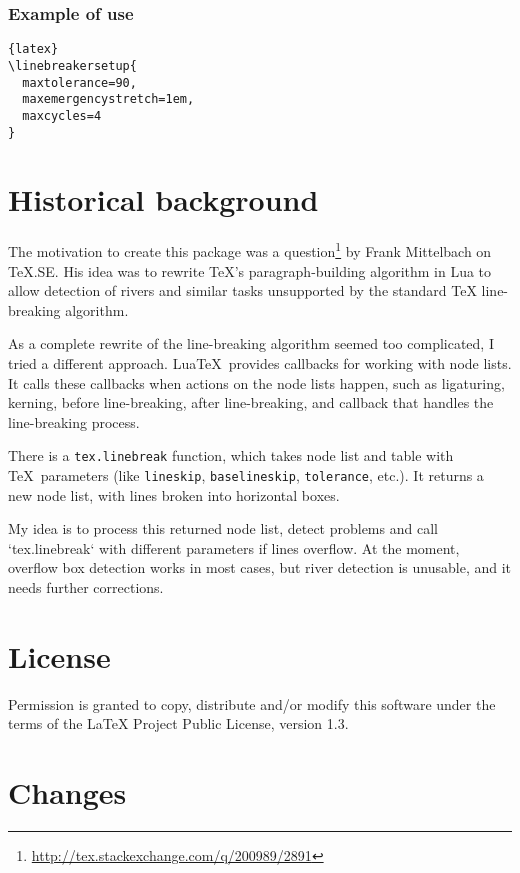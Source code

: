 \documentclass{l3doc}
\begin{document}
\subsubsection{Example of \cmd{\linebreakersetup} use}

\begin{lstlisting}{latex}
\linebreakersetup{
  maxtolerance=90,
  maxemergencystretch=1em,
  maxcycles=4
}
\end{lstlisting}



\section{Historical background}

The motivation to create this package was a 
question\footnote{\url{http://tex.stackexchange.com/q/200989/2891}} by Frank Mittelbach on
TeX.SE. His idea was to rewrite TeX’s paragraph-building algorithm in Lua to
allow detection of rivers and similar tasks unsupported by the standard TeX
line-breaking algorithm.

As a complete rewrite of the line-breaking algorithm seemed too complicated, 
I tried a different approach. Lua\TeX\ provides  callbacks for working with node lists. 
It calls these callbacks when actions on the node lists happen, such as 
ligaturing, kerning, before line-breaking, after line-breaking, and 
callback that  handles the line-breaking process. 

There is a \verb|tex.linebreak| function, which takes
node list and table with \TeX\ parameters (like \verb|lineskip|, \verb|baselineskip|, \verb|tolerance|,
etc.). It returns a new node list, with lines broken into horizontal boxes.

My idea is to process this returned node list, detect problems and call
`tex.linebreak` with different parameters if lines overflow. At the
moment, overflow box detection works in most cases, but river detection is unusable, and it needs further corrections.

\section{License}

Permission is granted to copy, distribute and/or modify this software
under the terms of the LaTeX Project Public License, version 1.3.

\section{Changes}
\end{document}
